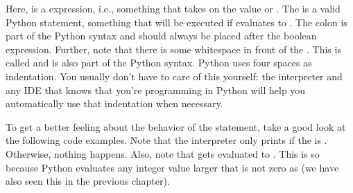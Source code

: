 \documentclass[letterpaper,10pt,english]{jupyterBook}
\begin{document}
\sphinxAtStartPar
Here,  is a  expression, i.e., something that takes on the value  or . The  is a valid Python statement, something that will be executed if  evaluates to . The colon \sphinxcode{\sphinxupquote{:}} is part of the Python syntax and should always be placed after the boolean expression. Further, note that there is some whitespace in front of the . This is called  and is also part of the Python syntax. Python uses four spaces as indentation. You usually don’t have to care of this yourself: the interpreter and any IDE that knows that you’re programming in Python will help you automatically use that indentation when necessary.

\sphinxAtStartPar
To get a better feeling about the behavior of the \sphinxhyphen{}statement, take a good look at the following code examples. Note that the interpreter only prints  if the  is . Otherwise, nothing happens. Also, note that  gets evaluated to . This is so because Python evaluates any integer value larger that is not zero as  (we have also seen this in the previous chapter).
\end{document}
